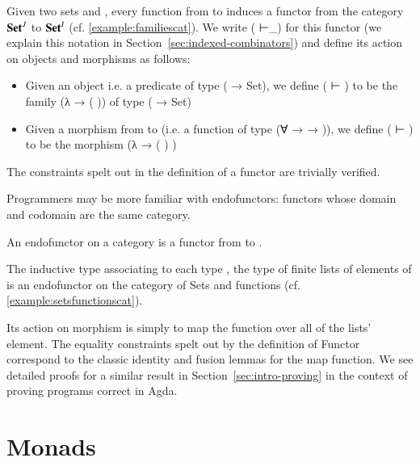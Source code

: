 \begin{example}[Reindexing]
\label{example:reindexingfunctor}
Given two sets  and , every function 
from  to  induces a functor from the category ${\mathbf{Set}}^J$ to
${\mathbf{Set}}^I$ (cf. \cref{example:familiescat}).
We write {( ⊢\_)} for this functor (we explain this notation in
Section~\ref{sec:indexed-combinators}) and define its action on objects
and morphisms as follows:

\begin{itemize}
  \item Given an object  i.e. a predicate of type ( → Set),
    we define {( ⊢ )} to be the
    family {(λ →  ( ))} of type ( → Set)
  \item Given a morphism  from  to  (i.e. a function
    of type {(∀ →   →  )}),
    we define {( ⊢ )} to be
    the morphism {(λ   →  ( ) )}
\end{itemize}

The constraints spelt out in the definition of a functor are trivially verified.
\end{example}

Programmers may be more familiar with endofunctors: functors whose domain
and codomain are the same category.

\begin{definition}[Endofunctor]\label{def:endofunctor}
An endofunctor on a category  is a functor
from  to .
\end{definition}

\begin{example}[List]
\label{example:listfunctor}
The inductive type associating to each type , the type of finite
lists of elements of  is an endofunctor on the category of Sets
and functions (cf. \cref{example:setsfunctionscat}).

Its action on morphism is simply to map the function over all of the lists'
element. The equality constraints spelt out by the definition of Functor
correspond to the classic identity and fusion lemmas for the map function.
We see detailed proofs for a similar result in Section~\ref{sec:intro-proving}
in the context of proving programs correct in Agda.
\end{example}

\section{Monads}

